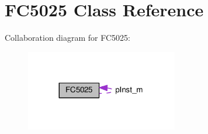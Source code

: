 \hypertarget{classFC5025}{}\section{F\+C5025 Class Reference}
\label{classFC5025}


Collaboration diagram for F\+C5025\+:\nopagebreak
\begin{figure}[H]
\begin{center}
\leavevmode
\includegraphics[width=188pt]{classFC5025__coll__graph}
\end{center}
\end{figure}
